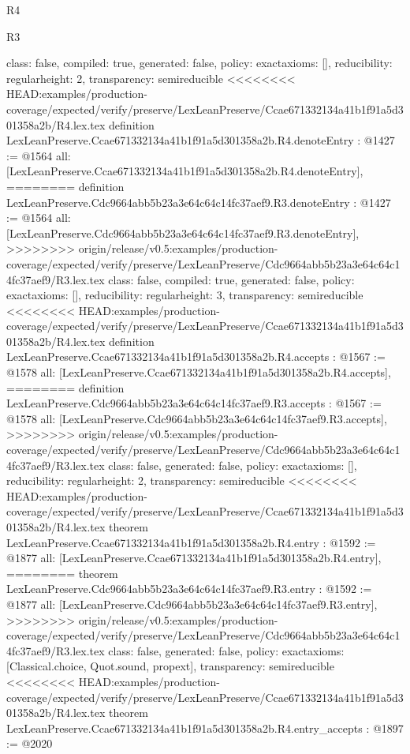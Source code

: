 \begin{lexlean}{R4}
\begin{lexlean}{R3}
\begin{coremodule}
{{{{{{{{{{{{  class: false,
  compiled: true,
  generated: false,
  policy: exact{axioms: []},
  reducibility: regular{height: 2},
  transparency: semireducible
}
<<<<<<<< HEAD:examples/production-coverage/expected/verify/preserve/LexLeanPreserve/Ccae671332134a41b1f91a5d301358a2b/R4.lex.tex
definition LexLeanPreserve.Ccae671332134a41b1f91a5d301358a2b.R4.denoteEntry : @1427 := @1564 {
  all: [LexLeanPreserve.Ccae671332134a41b1f91a5d301358a2b.R4.denoteEntry],
========
definition LexLeanPreserve.Cdc9664abb5b23a3e64c64c14fc37aef9.R3.denoteEntry : @1427 := @1564 {
  all: [LexLeanPreserve.Cdc9664abb5b23a3e64c64c14fc37aef9.R3.denoteEntry],
>>>>>>>> origin/release/v0.5:examples/production-coverage/expected/verify/preserve/LexLeanPreserve/Cdc9664abb5b23a3e64c64c14fc37aef9/R3.lex.tex
  class: false,
  compiled: true,
  generated: false,
  policy: exact{axioms: []},
  reducibility: regular{height: 3},
  transparency: semireducible
}
<<<<<<<< HEAD:examples/production-coverage/expected/verify/preserve/LexLeanPreserve/Ccae671332134a41b1f91a5d301358a2b/R4.lex.tex
definition LexLeanPreserve.Ccae671332134a41b1f91a5d301358a2b.R4.accepts : @1567 := @1578 {
  all: [LexLeanPreserve.Ccae671332134a41b1f91a5d301358a2b.R4.accepts],
========
definition LexLeanPreserve.Cdc9664abb5b23a3e64c64c14fc37aef9.R3.accepts : @1567 := @1578 {
  all: [LexLeanPreserve.Cdc9664abb5b23a3e64c64c14fc37aef9.R3.accepts],
>>>>>>>> origin/release/v0.5:examples/production-coverage/expected/verify/preserve/LexLeanPreserve/Cdc9664abb5b23a3e64c64c14fc37aef9/R3.lex.tex
  class: false,
  generated: false,
  policy: exact{axioms: []},
  reducibility: regular{height: 2},
  transparency: semireducible
}
<<<<<<<< HEAD:examples/production-coverage/expected/verify/preserve/LexLeanPreserve/Ccae671332134a41b1f91a5d301358a2b/R4.lex.tex
theorem LexLeanPreserve.Ccae671332134a41b1f91a5d301358a2b.R4.entry : @1592 := @1877 {
  all: [LexLeanPreserve.Ccae671332134a41b1f91a5d301358a2b.R4.entry],
========
theorem LexLeanPreserve.Cdc9664abb5b23a3e64c64c14fc37aef9.R3.entry : @1592 := @1877 {
  all: [LexLeanPreserve.Cdc9664abb5b23a3e64c64c14fc37aef9.R3.entry],
>>>>>>>> origin/release/v0.5:examples/production-coverage/expected/verify/preserve/LexLeanPreserve/Cdc9664abb5b23a3e64c64c14fc37aef9/R3.lex.tex
  class: false,
  generated: false,
  policy: exact{axioms: [Classical.choice, Quot.sound, propext]},
  transparency: semireducible
}
<<<<<<<< HEAD:examples/production-coverage/expected/verify/preserve/LexLeanPreserve/Ccae671332134a41b1f91a5d301358a2b/R4.lex.tex
theorem LexLeanPreserve.Ccae671332134a41b1f91a5d301358a2b.R4.entry_accepts : @1897 := @2020 {
}}}}}}}}}}}}}}}
\end{coremodule}
\end{lexlean}
\end{lexlean}
